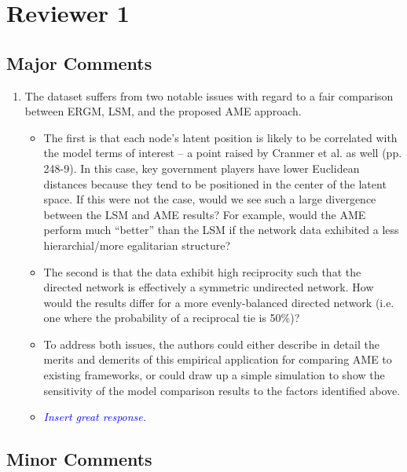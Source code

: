\section{Reviewer 1}

\subsection{Major Comments}

\begin{enumerate}
	\item  The dataset suffers from two notable issues with regard to a fair comparison between ERGM, LSM, and the proposed AME approach. 
	\begin{itemize}
		\item The first is that each node’s latent position is likely to be correlated with the model terms of interest – a point raised by Cranmer et al. as well (pp. 248-9). In this case, key government players have lower Euclidean distances because they tend to be positioned in the center of the latent space. If this were not the case, would we see such a large divergence between the LSM and AME results? For example, would the AME perform much ``better'' than the LSM if the network data exhibited a less hierarchial/more egalitarian structure? 
		\item The second is that the data exhibit high reciprocity such that the directed network is effectively a symmetric undirected network. How would the results differ for a more evenly-balanced directed network (i.e. one where the probability of a reciprocal tie is 50\%)? 
		\item To address both issues, the authors could either describe in detail the merits and demerits of this empirical application for comparing AME to existing frameworks, or could draw up a simple simulation to show the sensitivity of the model comparison results to the factors identified above. %
	\end{itemize}
	\begin{itemize}
		\item \textcolor{blue}{ \emph{
		Insert great response.
		}}
	\end{itemize}	
\end{enumerate}

\subsection{Minor Comments}

